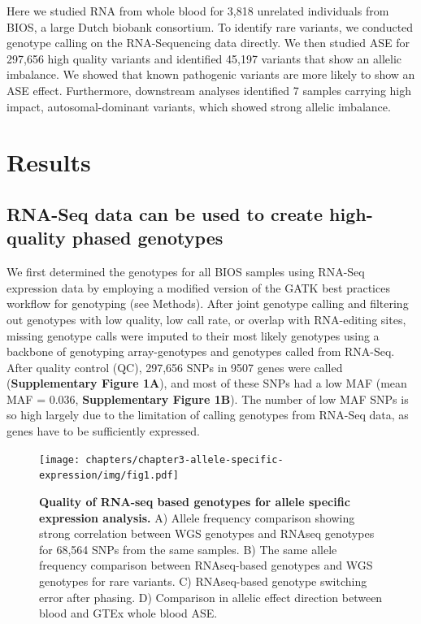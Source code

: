 Here we studied RNA from whole blood for 3,818 unrelated individuals from BIOS, a large Dutch biobank consortium. To identify rare variants, we conducted genotype calling on the RNA-Sequencing data directly. We then studied ASE for 297,656 high quality variants and identified 45,197 variants that show an allelic imbalance. We showed that known pathogenic variants are more likely to show an ASE effect. Furthermore, downstream analyses identified 7 samples carrying high impact, autosomal-dominant variants, which showed strong allelic imbalance.

\section{Results}
\subsection{RNA-Seq data can be used to create high-quality phased genotypes}
We first determined the genotypes for all BIOS samples using RNA-Seq expression data by employing a modified version of the GATK\cite{mckennaGenomeAnalysisToolkit2010} best practices workflow for genotyping (see Methods). After joint genotype calling and filtering out genotypes with low quality, low call rate, or overlap with RNA-editing sites, missing genotype calls were imputed to their most likely genotypes using a backbone of genotyping array-genotypes and genotypes called from RNA-Seq. After quality control (QC), 297,656 SNPs in 9507 genes were called (\textbf{Supplementary Figure 1A}), and most of these SNPs had a low MAF (mean MAF = 0.036, \textbf{Supplementary Figure 1B}). The number of low MAF SNPs is so high largely due to the limitation of calling genotypes from RNA-Seq data, as genes have to be sufficiently expressed.

\begin{figure}[h!]
	\texttt{[image: chapters/chapter3-allele-specific-expression/img/fig1.pdf]}
	\caption{\textbf{Quality of RNA-seq based genotypes for allele specific expression analysis.} A) Allele frequency comparison showing strong correlation between WGS genotypes and RNAseq genotypes for 68,564 SNPs from the same samples. B) The same allele frequency comparison between RNAseq-based genotypes and WGS genotypes for rare variants. C) RNAseq-based genotype switching error after phasing. D) Comparison in allelic effect direction between blood and GTEx whole blood ASE. }
	\label{ase_fig1}
\end{figure}

